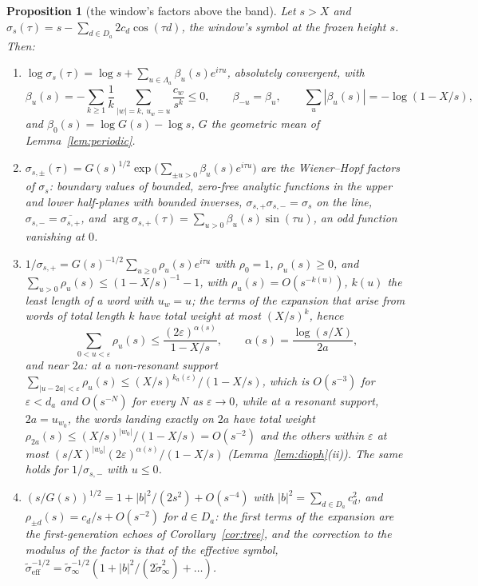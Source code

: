 \documentclass[11pt]{article}
\newtheorem{proposition}[theorem]{Proposition}
\theoremstyle{definition}
\theoremstyle{remark}
\begin{document}
\begin{proposition}[the window's factors above the band]\label{prop:lattice}
Let $s>X$ and $\sigma_s(\tau)=s-\sum_{d\in D_a}2c_d\cos(\tau d)$, the window's symbol at the frozen height $s$. Then:
\begin{enumerate}
\item[(i)] $\log\sigma_s(\tau)=\log s+\sum_{u\in\Lambda_a}\beta_u(s)e^{i\tau u}$, absolutely convergent, with
\[
\beta_u(s)=-\sum_{k\ge1}\frac1k\sum_{|w|=k,\ u_w=u}\frac{c_w}{s^k}\le0,\qquad \beta_{-u}=\beta_u,\qquad \sum_u|\beta_u(s)|=-\log(1-X/s),
\]
and $\beta_0(s)=\log G(s)-\log s$, $G$ the geometric mean of Lemma~\ref{lem:periodic}.
\item[(ii)] $\sigma_{s,\pm}(\tau)=G(s)^{1/2}\exp\big(\sum_{\pm u>0}\beta_u(s)e^{i\tau u}\big)$ are the Wiener--Hopf factors of $\sigma_s$: boundary values of bounded, zero-free analytic functions in the upper and lower half-planes with bounded inverses, $\sigma_{s,+}\sigma_{s,-}=\sigma_s$ on the line, $\sigma_{s,-}=\overline{\sigma_{s,+}}$, and $\arg\sigma_{s,+}(\tau)=\sum_{u>0}\beta_u(s)\sin(\tau u)$, an odd function vanishing at $0$.
\item[(iii)] $1/\sigma_{s,+}=G(s)^{-1/2}\sum_{u\ge0}\rho_u(s)e^{i\tau u}$ with $\rho_0=1$, $\rho_u(s)\ge0$, and $\sum_{u>0}\rho_u(s)\le(1-X/s)^{-1}-1$, with $\rho_u(s)=O(s^{-k(u)})$, $k(u)$ the least length of a word with $u_w=u$; the terms of the expansion that arise from words of total length $k$ have total weight at most $(X/s)^k$, hence
\[
\sum_{0<u<\varepsilon}\rho_u(s)\le\frac{(2\varepsilon)^{\alpha(s)}}{1-X/s},\qquad\alpha(s)=\frac{\log(s/X)}{2a},
\]
and near $2a$: at a non-resonant support $\sum_{|u-2a|<\varepsilon}\rho_u(s)\le(X/s)^{k_a(\varepsilon)}/(1-X/s)$, which is $O(s^{-3})$ for $\varepsilon<d_a$ and $O(s^{-N})$ for every $N$ as $\varepsilon\to0$, while at a resonant support, $2a=u_{w_0}$, the words landing exactly on $2a$ have total weight $\rho_{2a}(s)\le(X/s)^{|w_0|}/(1-X/s)=O(s^{-2})$ and the others within $\varepsilon$ at most $(s/X)^{|w_0|}(2\varepsilon)^{\alpha(s)}/(1-X/s)$ (Lemma~\ref{lem:dioph}(ii)). The same holds for $1/\sigma_{s,-}$ with $u\le0$.
\item[(iv)] $(s/G(s))^{1/2}=1+|b|^2/(2s^2)+O(s^{-4})$ with $|b|^2=\sum_{d\in D_a}c_d^2$, and $\rho_{\pm d}(s)=c_d/s+O(s^{-2})$ for $d\in D_a$: the first terms of the expansion are the first-generation echoes of Corollary~\ref{cor:tree}, and the correction to the modulus of the factor is that of the effective symbol, $\tilde\sigma_{\mathrm{eff}}^{-1/2}=\tilde\sigma_\infty^{-1/2}(1+|b|^2/(2\tilde\sigma_\infty^2)+\dots)$.
\end{enumerate}
\end{proposition}
\end{document}
